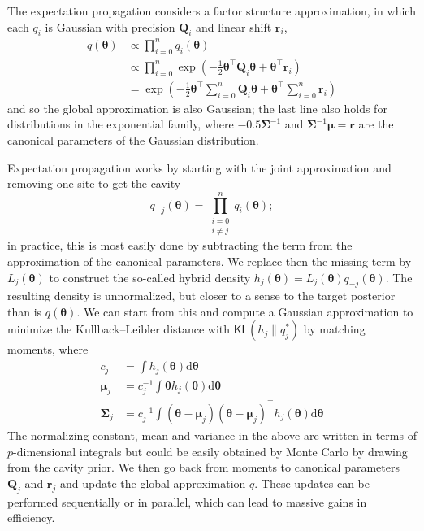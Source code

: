 \documentclass[
  11pt,
  letterpaper,
]{scrbook}
\theoremstyle{definition}
\theoremstyle{plain}
\theoremstyle{plain}
\theoremstyle{plain}
\theoremstyle{definition}
\theoremstyle{definition}
\theoremstyle{remark}
\begin{document}
The expectation propagation considers a factor structure approximation,
in which each \(q_i\) is Gaussian with precision \(\mathbf{Q}_i\) and
linear shift \(\boldsymbol{r}_i\), \begin{align*}
 q(\boldsymbol{\theta}) &\propto \prod_{i=0}^n q_i(\boldsymbol{\theta})
 \\& \propto \prod_{i=0}^n \exp \left(-\frac{1}{2} \boldsymbol{\theta}^\top\mathbf{Q}_i\boldsymbol{\theta} + \boldsymbol{\theta}^\top\boldsymbol{r}_i\right)
 \\ &= \exp \left( - \frac{1}{2} \boldsymbol{\theta}^\top \sum_{i=0}^n\mathbf{Q}_i\boldsymbol{\theta} + \boldsymbol{\theta}^\top \sum_{i=0}^n\boldsymbol{r}_i\right)
\end{align*} and so the global approximation is also Gaussian; the last
line also holds for distributions in the exponential family, where
\(-0.5\boldsymbol{\Sigma}^{-1}\) and
\(\boldsymbol{\Sigma}^{-1}\boldsymbol{\mu} = \boldsymbol{r}\) are the
canonical parameters of the Gaussian distribution.

Expectation propagation works by starting with the joint approximation
and removing one site to get the cavity
\[q_{-j}(\boldsymbol{\theta}) = \prod_{\substack{i = 0\\i \neq j}}^n q_{i}(\boldsymbol{\theta});\]
in practice, this is most easily done by subtracting the term from the
approximation of the canonical parameters. We replace then the missing
term by \(L_j(\boldsymbol{\theta})\) to construct the so-called hybrid
density
\(h_j(\boldsymbol{\theta}) = L_j(\boldsymbol{\theta})q_{-j}(\boldsymbol{\theta}).\)
The resulting density is unnormalized, but closer to a sense to the
target posterior than is \(q(\boldsymbol{\theta}).\) We can start from
this and compute a Gaussian approximation to minimize the
Kullback--Leibler distance with \(\mathsf{KL}(h_j \parallel q^*_j)\) by
matching moments, where \begin{align*}
 c_j &= \int h_j(\boldsymbol{\theta}) \mathrm{d} \boldsymbol{\theta} \\
 \boldsymbol{\mu}_j &= c_{j}^{-1} \int \boldsymbol{\theta} h_j(\boldsymbol{\theta}) \mathrm{d} \boldsymbol{\theta}
 \\ \boldsymbol{\Sigma}_j &= c_j^{-1} \int (\boldsymbol{\theta} - \boldsymbol{\mu}_j)(\boldsymbol{\theta} - \boldsymbol{\mu}_j)^\top h_j(\boldsymbol{\theta}) \mathrm{d} \boldsymbol{\theta}
\end{align*} The normalizing constant, mean and variance in the above
are written in terms of \(p\)-dimensional integrals but could be easily
obtained by Monte Carlo by drawing from the cavity prior. We then go
back from moments to canonical parameters \(\mathbf{Q}_j\) and
\(\boldsymbol{r}_j\) and update the global approximation \(q.\) These
updates can be performed sequentially or in parallel, which can lead to
massive gains in efficiency.
\end{document}
